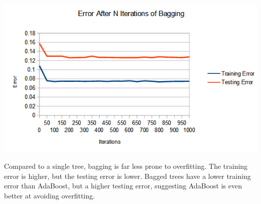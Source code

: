 \documentclass[12pt, fullpage,letterpaper]{article}
\begin{document}
\begin{enumerate}
\begin{enumerate}
	\begin{center}
		\includegraphics[scale=0.8]{bagging_graph}
	\end{center}
	
	Compared to a single tree, bagging is far less prone to overfitting. The training error is higher, but the testing error is lower. Bagged trees have a lower training error than AdaBoost, but a higher testing error, suggesting AdaBoost is even better at avoiding overfitting.
	
	\bigskip


\end{enumerate}
\end{enumerate}
\end{document}
